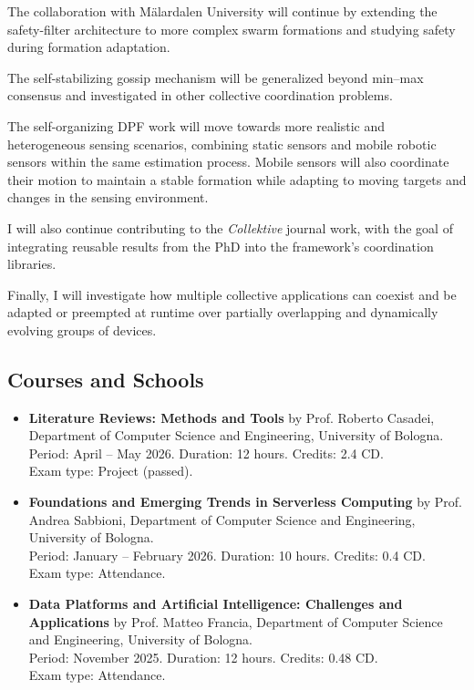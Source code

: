 \documentclass[11pt]{scrartcl}
\newcommand{\courseentry}[7]{%
  \item
  \textbf{#1} by #2, #3.\\
  Period: #4. Duration: #5. Credits: #6 CD.\\
  Exam type: #7.
}
\newenvironment{courses}
  {%
    \subsection*{Courses and Schools}
    \begin{itemize}
  }
  {%
    \end{itemize}
  }
\begin{document}
The collaboration with Mälardalen University will continue by extending the safety-filter architecture to
more complex swarm formations and studying safety during formation adaptation.

The self-stabilizing gossip mechanism will be generalized beyond min--max consensus
and investigated in other collective coordination problems.

The self-organizing DPF work will move towards more realistic and heterogeneous sensing scenarios,
combining static sensors and mobile robotic sensors within the same estimation process.
%
Mobile sensors will also coordinate their motion to maintain a stable formation while adapting
to moving targets and changes in the sensing environment.

I will also continue contributing to the \textit{Collektive} journal work,
with the goal of integrating reusable results from the PhD into the framework's coordination libraries.

Finally, I will investigate how multiple collective applications can coexist and be adapted or
preempted at runtime over partially overlapping and dynamically evolving groups of devices.


%


\begin{courses}

  \courseentry
  {Literature Reviews: Methods and Tools}
  {Prof. Roberto Casadei}
  {Department of Computer Science and Engineering, University of Bologna}
  {April -- May 2026}
  {12 hours}
  {2.4}
  {Project (passed)}

  \courseentry
  {Foundations and Emerging Trends in Serverless Computing}
  {Prof. Andrea Sabbioni}
  {Department of Computer Science and Engineering, University of Bologna}
  {January -- February 2026}
  {10 hours}
  {0.4}
  {Attendance}

  \courseentry
  {Data Platforms and Artificial Intelligence: Challenges and Applications}
  {Prof. Matteo Francia}
  {Department of Computer Science and Engineering, University of Bologna}
  {November 2025}
  {12 hours}
  {0.48}
  {Attendance}

\end{courses}
\end{document}
